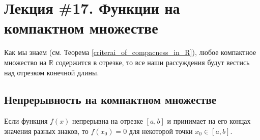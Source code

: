 \section{Лекция \#17. Функции на компактном множестве}

Как мы знаем (см. Теорема \ref{criterai_of_compacness_in_R}), любое компактное множество на $\mathbb{R}$ содержится в отрезке, то все наши рассуждения будут вестись над отрезком конечной длины.

\subsection{Непрерывность на компактном множестве}

\begin{theorem}\label{intermediat_theorem}
 Если функция $f(x)$ непрерывна на отрезке $[a,b]$ и принимает на его концах значения разных знаков, то $f(x_0) = 0$ для некоторой точки $x_0 \in [a,b]$.    
\end{theorem}
